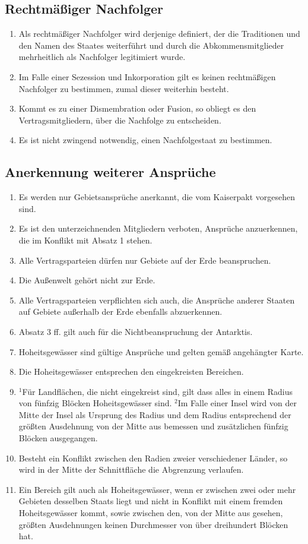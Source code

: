 \documentclass{article}
\begin{document}
\subsection{Rechtmäßiger Nachfolger}
\begin{enumerate}[(1)]
    \item Als rechtmäßiger Nachfolger wird derjenige definiert, der die Traditionen und den Namen des Staates weiterführt und durch die Abkommensmitglieder mehrheitlich als Nachfolger legitimiert wurde.
    \item Im Falle einer Sezession und Inkorporation gilt es keinen rechtmäßigen Nachfolger zu bestimmen, zumal dieser weiterhin besteht.
    \item Kommt es zu einer Dismembration oder Fusion, so obliegt es den Vertragsmitgliedern, über die Nachfolge zu entscheiden.
    \item Es ist nicht zwingend notwendig, einen Nachfolgestaat zu bestimmen.
\end{enumerate}

\subsection{Anerkennung weiterer Ansprüche}
\begin{enumerate}[(1)]
    \item Es werden nur Gebietsansprüche anerkannt, die vom Kaiserpakt vorgesehen sind.
    \item Es ist den unterzeichnenden Mitgliedern verboten, Ansprüche anzuerkennen, die im Konflikt mit Absatz 1 stehen.
    \item Alle Vertragsparteien dürfen nur Gebiete auf der Erde beanspruchen.
    \item Die Außenwelt gehört nicht zur Erde.
    \item Alle Vertragsparteien verpflichten sich auch, die Ansprüche anderer Staaten auf Gebiete außerhalb der Erde ebenfalls abzuerkennen.
    \item Absatz 3 ff. gilt auch für die Nichtbeanspruchung der Antarktis.
    \item Hoheitsgewässer sind gültige Ansprüche und gelten gemäß angehängter Karte.
    \item Die Hoheitsgewässer entsprechen den eingekreisten Bereichen.
    \item ${^1}$Für Landflächen, die nicht eingekreist sind, gilt dass alles in einem Radius von fünfzig Blöcken Hoheitsgewässer sind. ${^2}$Im Falle einer Insel wird von der Mitte der Insel als Ursprung des Radius und dem Radius entsprechend der größten Ausdehnung von der Mitte aus bemessen und zusätzlichen fünfzig Blöcken ausgegangen.
    \item Besteht ein Konflikt zwischen den Radien zweier verschiedener Länder, so wird in der Mitte der Schnittfläche die Abgrenzung verlaufen.
    \item Ein Bereich gilt auch als Hoheitsgewässer, wenn er zwischen zwei oder mehr Gebieten desselben Staats liegt und nicht in Konflikt mit einem fremden Hoheitsgewässer kommt, sowie zwischen den, von der Mitte aus gesehen, größten Ausdehnungen keinen Durchmesser von über dreihundert Blöcken hat. 
\end{enumerate}
\end{document}
